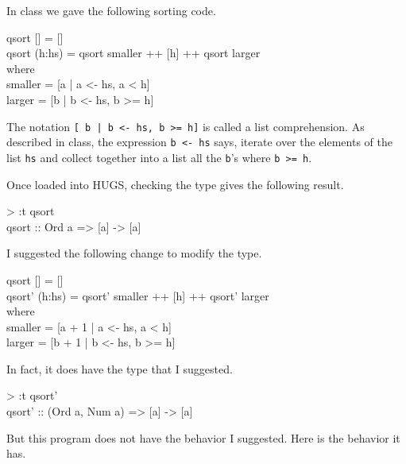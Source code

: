 \documentclass[11pt]{article}
\begin{document}


In class we gave the following sorting code.

\begin{program*}
\> qsort [] = [] \\
\> qsort (h:hs) = qsort smaller ++ [h] ++ qsort larger \\
\>  where                                              \\
\>     smaller = [a | a <- hs, a < h]                  \\
\>     larger = [b | b <- hs, b >= h]                  \\
\end{program*}

The notation {\tt{[ b | b <- hs, b >= h]}} is called a list comprehension. As
described in class, the expression {\tt{b <- hs}} says, iterate over the
elements of the list {\tt{hs}} and collect together into a list all the
{\tt{b}}'s where {\tt{b >= h}}.

Once loaded into HUGS, checking the type gives the following result. 
\begin{program*}
\> > :t qsort                   \\
\> qsort :: Ord a => [a] -> [a] \\
\>
\end{program*}

I suggested the following change to modify the type.
\begin{program*}
\> qsort [] = [] \\
\> qsort' (h:hs) = qsort' smaller ++ [h] ++ qsort' larger \\
\>  where                                              \\
\>     smaller = [a + 1 | a <- hs, a < h]                  \\
\>     larger = [b + 1 | b <- hs, b >= h]                  \\
\end{program*}

In fact, it does have the type that I suggested.

\begin{program*}
\> > :t qsort'                                \\
\> qsort' :: (Ord a, Num a) => [a] -> [a]   \\
\end{program*}

But this program does not have the behavior I suggested.  Here is the behavior it has.
\end{document}
